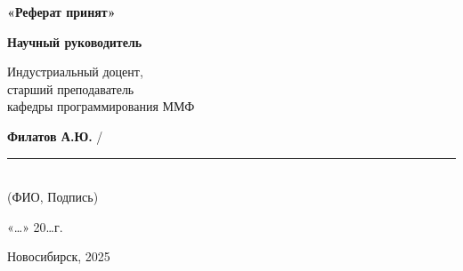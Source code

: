 \hspace*{\fill} %
\begin{minipage}[t]{0.5\textwidth}
  \textbf{«Реферат принят»}
  
  \vspace{0.5cm} %
  
  \textbf{Научный руководитель}
  
  \vspace{0.5cm} %
  
  Индустриальный доцент, \\
  старший преподаватель \\
  кафедры программирования ММФ
  
  \vspace{1cm} %
  \textbf{Филатов А.Ю.} / \rule{4cm}{0.4pt} \\ %
  \small (ФИО, Подпись) %

  \vspace{1cm} %

  «\ldots»\makebox[7em]{\dotfill} 20\ldots г. %
\end{minipage}

\vfill %

\begin{center}
Новосибирск, 2025
\end{center}
